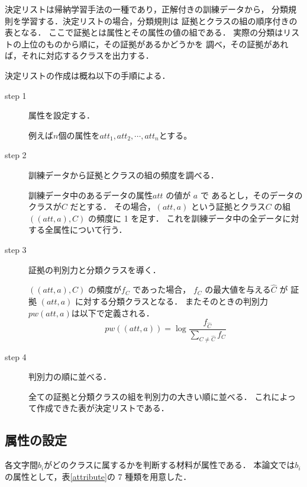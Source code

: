決定リストは帰納学習手法の一種であり，正解付きの訓練データから，
分類規則を学習する．決定リストの場合，分類規則は
証拠とクラスの組の順序付きの表となる．
ここで証拠とは属性とその属性の値の組である．
実際の分類はリストの上位のものから順に，その証拠があるかどうかを
調べ，その証拠があれば，それに対応するクラスを出力する．

決定リストの作成は概ね以下の手順による．

\begin{description}
\item[step 1] 属性を設定する．

例えば\( n \)個の属性を\( att_{1} , att_{2} , \cdots , att_{n} \)とする。

\item[step 2] 訓練データから証拠とクラスの組の頻度を調べる．

訓練データ中のあるデータの属性\( att \) の値が \( a \) で
あるとし，そのデータのクラスが\( C \) だとする．
その場合，\( (att,a) \) という証拠とクラス\( C \) の組
\( ((att,a),C) \) の頻度に 1 を足す．
これを訓練データ中の全データに対する全属性について行う．

\item[step 3] 証拠の判別力と分類クラスを導く．

\( ((att,a),C) \) の頻度が\( f_{C} \) であった場合，
\( f_{C} \) の最大値を与える\( \hat{C} \) が
証拠 \( (att,a) \) に対する分類クラスとなる．
またそのときの判別力\( pw(att,a) \)は以下で定義される．
\[
pw((att,a)) = \log \frac{f_{\hat{C}}}{\sum_{C \neq \hat{C}} f_{C}}
\]

\item[step 4] 判別力の順に並べる．

全ての証拠と分類クラスの組を判別力の大きい順に並べる．
これによって作成できた表が決定リストである．

\end{description}

\subsection{属性の設定}

各文字間\( b_i \)がどのクラスに属するかを判断する材料が属性である．
本論文では\( b_i \)の属性として，\mbox{表\ref{attribute}}の 7 種類を用意した．

